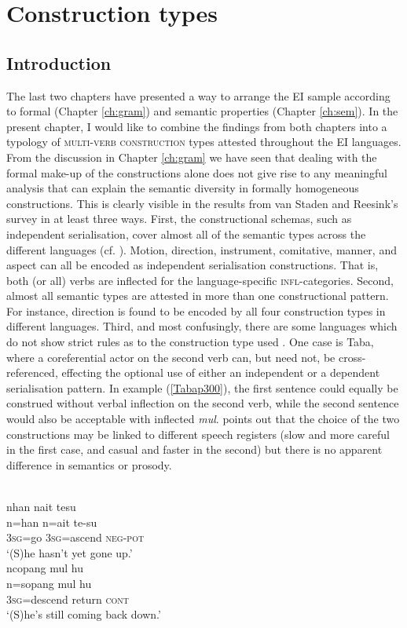 \chapter{Construction types} \label{ch:constructions}
\section{Introduction}

The last two chapters have presented a way to arrange the EI sample according to formal (Chapter \ref{ch:gram}) and semantic properties (Chapter \ref{ch:sem}). In the present chapter, I would like to combine the findings from both chapters into a typology of \textsc{multi-verb construction} types attested throughout the EI languages. From the discussion in Chapter \ref{ch:gram} we have seen that dealing with the formal make-up of the constructions alone does not give rise to any meaningful analysis that can explain the semantic diversity in formally homogeneous constructions. This is clearly visible in the results from van Staden and Reesink's survey in at least three ways. First, the constructional schemas, such as independent serialisation, cover almost all of the semantic types across the different languages (cf. \citealt[34]{vanstaden2008serial}). Motion, direction, instrument, comitative, manner, and aspect can all be encoded as independent serialisation constructions. That is, both (or all) verbs are inflected for the language-specific \textsc{infl}-categories. Second, almost all semantic types are attested in more than one constructional pattern. For instance, direction is found to be encoded by all four construction types in different languages. Third, and most confusingly, there are some languages which do not show strict rules as to the construction type used \citep[24f.]{vanstaden2008serial}. One case is Taba, where a coreferential actor on the second verb can, but need not, be cross-referenced, effecting the optional use of either an independent  or a dependent serialisation pattern. In example (\ref{Tabap300}), the first sentence could equally be construed without verbal inflection on the second verb, while the second sentence would also be acceptable with inflected \textit{mul}. \citet[300]{bowden2001taba} points out that the choice of the two constructions may be linked to different speech registers (slow and more careful in the first case, and casual and faster in the second) but there is no apparent difference in semantics or prosody.

\ea \label{Tabap300}
\\
\ea
\glll nhan nait tesu \\
n=han n=ait te-su \\
\textsc{3}\textsc{sg}=go \textsc{3}\textsc{sg}=ascend \textsc{neg}-\textsc{pot} \\
\glft `(S)he hasn't yet gone up.' \\ 
\ex
\glll ncopang mul hu \\ 
n=sopang mul hu \\
\textsc{3}\textsc{sg}=descend return \textsc{cont} \\
\glft `(S)he's still coming back down.'\\ 
\z
\z

